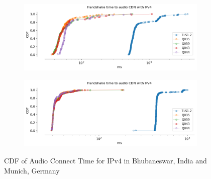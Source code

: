 \begin{frame}
\begin{figure}[!htb]
    
    \begin{subfigure}{0.5\textwidth}
        \includegraphics[width=\linewidth]{./plots/youtube/india/graph_audio_connect_time.png}
    \end{subfigure}
    \begin{subfigure}{0.5\textwidth}
        \includegraphics[width=\linewidth]{./plots/youtube/munich/graph_audio_connect_time.png}
    \end{subfigure}    
    \caption{CDF of Audio Connect Time for IPv4 in Bhubaneswar, India and Munich, Germany}\label{fig:cdf-of-audio}
\end{figure}

\end{frame}
\clearpage

